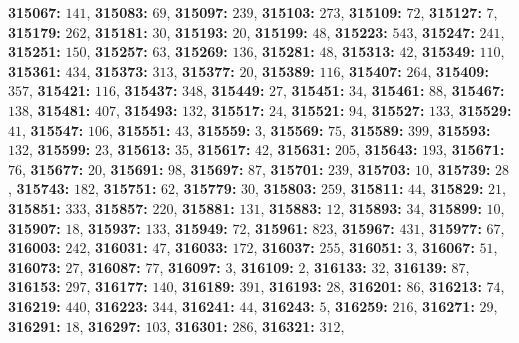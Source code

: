 \textsf{\bfseries 315067:} $141$, \textsf{\bfseries 315083:} $69$, \textsf{\bfseries 315097:} $239$, \textsf{\bfseries 315103:} $273$, \textsf{\bfseries 315109:} $72$, \textsf{\bfseries 315127:} $7$, \textsf{\bfseries 315179:} $262$, \textsf{\bfseries 315181:} $30$, \textsf{\bfseries 315193:} $20$, \textsf{\bfseries 315199:} $48$, \textsf{\bfseries 315223:} $543$, \textsf{\bfseries 315247:} $241$, \textsf{\bfseries 315251:} $150$, \textsf{\bfseries 315257:} $63$, \textsf{\bfseries 315269:} $136$, \textsf{\bfseries 315281:} $48$, \textsf{\bfseries 315313:} $42$, \textsf{\bfseries 315349:} $110$, \textsf{\bfseries 315361:} $434$, \textsf{\bfseries 315373:} $313$, \textsf{\bfseries 315377:} $20$, \textsf{\bfseries 315389:} $116$, \textsf{\bfseries 315407:} $264$, \textsf{\bfseries 315409:} $357$, \textsf{\bfseries 315421:} $116$, \textsf{\bfseries 315437:} $348$, \textsf{\bfseries 315449:} $27$, \textsf{\bfseries 315451:} $34$, \textsf{\bfseries 315461:} $88$, \textsf{\bfseries 315467:} $138$, \textsf{\bfseries 315481:} $407$, \textsf{\bfseries 315493:} $132$, \textsf{\bfseries 315517:} $24$, \textsf{\bfseries 315521:} $94$, \textsf{\bfseries 315527:} $133$, \textsf{\bfseries 315529:} $41$, \textsf{\bfseries 315547:} $106$, \textsf{\bfseries 315551:} $43$, \textsf{\bfseries 315559:} $3$, \textsf{\bfseries 315569:} $75$, \textsf{\bfseries 315589:} $399$, \textsf{\bfseries 315593:} $132$, \textsf{\bfseries 315599:} $23$, \textsf{\bfseries 315613:} $35$, \textsf{\bfseries 315617:} $42$, \textsf{\bfseries 315631:} $205$, \textsf{\bfseries 315643:} $193$, \textsf{\bfseries 315671:} $76$, \textsf{\bfseries 315677:} $20$, \textsf{\bfseries 315691:} $98$, \textsf{\bfseries 315697:} $87$, \textsf{\bfseries 315701:} $239$, \textsf{\bfseries 315703:} $10$, \textsf{\bfseries 315739:} $28$, \textsf{\bfseries 315743:} $182$, \textsf{\bfseries 315751:} $62$, \textsf{\bfseries 315779:} $30$, \textsf{\bfseries 315803:} $259$, \textsf{\bfseries 315811:} $44$, \textsf{\bfseries 315829:} $21$, \textsf{\bfseries 315851:} $333$, \textsf{\bfseries 315857:} $220$, \textsf{\bfseries 315881:} $131$, \textsf{\bfseries 315883:} $12$, \textsf{\bfseries 315893:} $34$, \textsf{\bfseries 315899:} $10$, \textsf{\bfseries 315907:} $18$, \textsf{\bfseries 315937:} $133$, \textsf{\bfseries 315949:} $72$, \textsf{\bfseries 315961:} $823$, \textsf{\bfseries 315967:} $431$, \textsf{\bfseries 315977:} $67$, \textsf{\bfseries 316003:} $242$, \textsf{\bfseries 316031:} $47$, \textsf{\bfseries 316033:} $172$, \textsf{\bfseries 316037:} $255$, \textsf{\bfseries 316051:} $3$, \textsf{\bfseries 316067:} $51$, \textsf{\bfseries 316073:} $27$, \textsf{\bfseries 316087:} $77$, \textsf{\bfseries 316097:} $3$, \textsf{\bfseries 316109:} $2$, \textsf{\bfseries 316133:} $32$, \textsf{\bfseries 316139:} $87$, \textsf{\bfseries 316153:} $297$, \textsf{\bfseries 316177:} $140$, \textsf{\bfseries 316189:} $391$, \textsf{\bfseries 316193:} $28$, \textsf{\bfseries 316201:} $86$, \textsf{\bfseries 316213:} $74$, \textsf{\bfseries 316219:} $440$, \textsf{\bfseries 316223:} $344$, \textsf{\bfseries 316241:} $44$, \textsf{\bfseries 316243:} $5$, \textsf{\bfseries 316259:} $216$, \textsf{\bfseries 316271:} $29$, \textsf{\bfseries 316291:} $18$, \textsf{\bfseries 316297:} $103$, \textsf{\bfseries 316301:} $286$, \textsf{\bfseries 316321:} $312$, 
